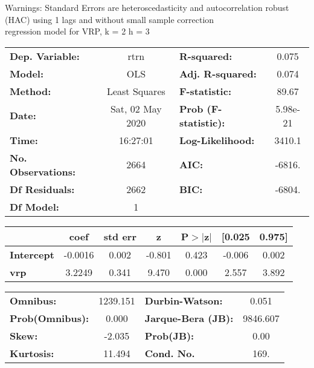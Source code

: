 Warnings: \newline
 [1] Standard Errors are heteroscedasticity and autocorrelation robust (HAC) using 1 lags and without small sample correction\\ 

regression model for VRP, k = 2 h = 3\begin{center}
\begin{tabular}{lclc}
\toprule
\textbf{Dep. Variable:}    &       rtrn       & \textbf{  R-squared:         } &     0.075   \\
\textbf{Model:}            &       OLS        & \textbf{  Adj. R-squared:    } &     0.074   \\
\textbf{Method:}           &  Least Squares   & \textbf{  F-statistic:       } &     89.67   \\
\textbf{Date:}             & Sat, 02 May 2020 & \textbf{  Prob (F-statistic):} &  5.98e-21   \\
\textbf{Time:}             &     16:27:01     & \textbf{  Log-Likelihood:    } &    3410.1   \\
\textbf{No. Observations:} &        2664      & \textbf{  AIC:               } &    -6816.   \\
\textbf{Df Residuals:}     &        2662      & \textbf{  BIC:               } &    -6804.   \\
\textbf{Df Model:}         &           1      & \textbf{                     } &             \\
\bottomrule
\end{tabular}
\begin{tabular}{lcccccc}
                   & \textbf{coef} & \textbf{std err} & \textbf{z} & \textbf{P$> |$z$|$} & \textbf{[0.025} & \textbf{0.975]}  \\
\midrule
\textbf{Intercept} &      -0.0016  &        0.002     &    -0.801  &         0.423        &       -0.006    &        0.002     \\
\textbf{vrp}       &       3.2249  &        0.341     &     9.470  &         0.000        &        2.557    &        3.892     \\
\bottomrule
\end{tabular}
\begin{tabular}{lclc}
\textbf{Omnibus:}       & 1239.151 & \textbf{  Durbin-Watson:     } &    0.051  \\
\textbf{Prob(Omnibus):} &   0.000  & \textbf{  Jarque-Bera (JB):  } & 9846.607  \\
\textbf{Skew:}          &  -2.035  & \textbf{  Prob(JB):          } &     0.00  \\
\textbf{Kurtosis:}      &  11.494  & \textbf{  Cond. No.          } &     169.  \\
\bottomrule
\end{tabular}
\end{center}


